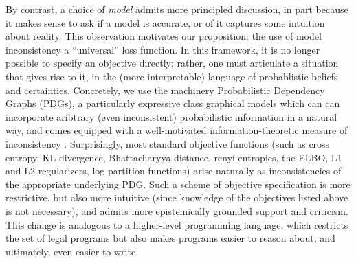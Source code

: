 \documentclass{article}
\theoremstyle{plain}
\theoremstyle{definition}
\begin{document}
By contrast, a choice of \emph{model} admits more principled discussion, in part because it makes sense to ask if a model is accurate, or of it captures some intuition about reality.
This observation motivates our proposition: the use of model inconsistency a ``universal'' loss function. In this framework, it is no longer possible to specify an objective directly; rather, one must articulate a situation that gives rise to it, in the (more interpretable) language of probablistic beliefs and certainties. %
Concretely, we use the machinery Probabilistic Dependency Graphs (PDGs), a particularly expressive class graphical models which can can incorporate aribtrary (even inconsistent) probabilistic information in a natural way, and comes equipped with a well-motivated information-theoretic measure of inconsistency  \cite{richardson2020probabilistic}.
Surprisingly, most standard objective functions (such as cross entropy, KL divergence, Bhattacharyya distance, reny\'i entropies, the ELBO, L1 and L2 regularizers, log partition functions) arise naturally as inconsistencies of the appropriate underlying PDG.
Such a scheme of objective specification is more restrictive, but also more intuitive (since knowledge of the objectives listed above is not necessary), and admits more epistemically grounded support and criticism.
This change is analogous to a higher-level programming language, which restricts the set of legal programs but also makes programs easier to reason about, and ultimately,  even easier to write.


\end{document}
